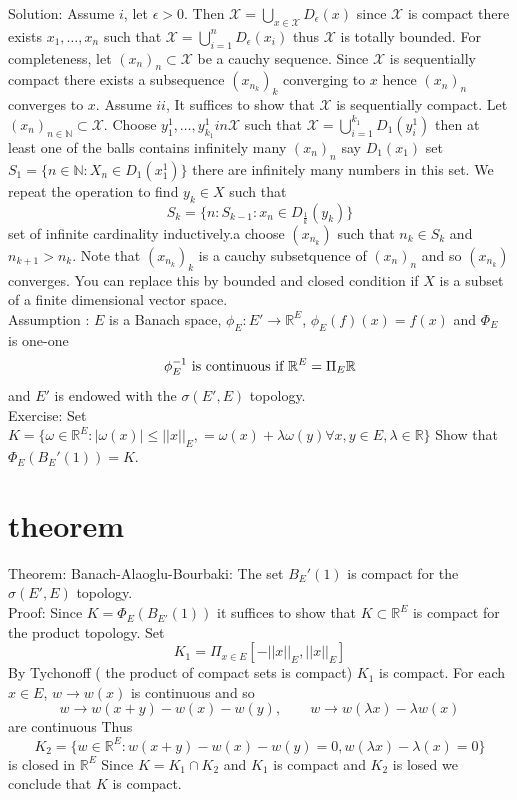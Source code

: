 \documentclass[11pt]{article}
\begin{document}
Solution: Assume $i$, let  $\epsilon > 0$. Then $ \mathcal{X} = \bigcup_{x \in \mathcal{X}} D_\epsilon(x)$ 
since $ \mathcal{X}$ is compact there exists $x_1,\dots,x_n$ such that $ \mathcal{X} = \bigcup_{i=1}^{n}D_\epsilon(x_i)$ thus $ \mathcal{X}$ is totally bounded.
For completeness, let $ (x_n)_n \subset \mathcal{X}$ be a cauchy sequence. Since $ \mathcal{X}$ is sequentially compact
there exists a subsequence $(x_{n_k})_k$ converging to  $x$ hence $(x_n)_n$ converges to  $ x$.
Assume $ii$, It suffices to show that $ \mathcal{X}$ is sequentially compact. Let $(x_n)_{n \in \mathbb{N}} \subset \mathcal{X}$.
Choose $y_1^{1},\dots,y_{k_1}^{1} in \mathcal{X}$  such that $ \mathcal{X} = \bigcup_{i=1}^{k_1}D_1(y_i^{1})$ then at least one of the balls contains infinitely many $(x_n)_n$ say  $D_1(x_1)$ set $S_1 = \{n \in \mathbb{N}: X_n \in D_1(x_1^{1})\}$ there are infinitely many numbers in this set.
We repeat the operation to find $y_k \in X$ such that
\[
    S_k = \{n : S_{k-1} : x_n \in D_{\frac{1}{k}}(y_k)\}
\] 
set of infinite cardinality inductively.a choose $(x_{n_k})$ such that $n_k \in S_k$ and  $n_{k+1} > n_k$. Note that  $(x_{n_k})_k$ is a cauchy
subsetquence of  $(x_n)_n$ and so  $(x_{n_k})$ converges. You can replace this by bounded and closed condition if $X$ is a subset of a finite dimensional vector space.\\
Assumption : $ E$ is a Banach space,  $\phi_E : E' \rightarrow \mathbb{R}^{E}$, $\phi_E(f)(x) = f(x)$ and $\Phi_E$ is one-one
 \[
     \phi_E^{-1} \text{ is continuous if $ \mathbb{R}^{E} = \Pi_E \mathbb{R}$}
\] 
and $E'$ is endowed with the  $\sigma(E', E)$ topology.\\
Exercise: Set $K = \{\omega \in \mathbb{R}^{E}: |\omega(x)| \le ||x||_E,  = \omega(x) + \lambda\omega(y) \forall x,y \in E, \lambda \in \mathbb{R}\}$
Show that $\Phi_E(B_E'(1)) = K$.
\section{theorem}
Theorem: Banach-Alaoglu-Bourbaki:
The set  $B_E'(1)$ is compact for the  $\sigma(E', E)$ topology.\\
Proof: Since $K = \Phi_E(B_{E'}(1))$ it suffices to show that  $K \subset \mathbb{R}^{E}$ is compact 
for the product topology. Set
\[
    K_1 = \Pi_{x \in E}[-||x||_E, ||x||_E]
\] 
By Tychonoff ( the product of compact sets is compact) $K_1$ is compact. For each $x \in E$,  $w \rightarrow w(x)$ is continuous and so 
\[
w \rightarrow w(x+y) - w(x) - w(y), \qquad w \to w(\lambda x) - \lambda w(x)
\] 
are continuous Thus
\[
    K_2 = \{w \in \mathbb{R}^{E}: w(x+y) - w(x) - w(y) = 0, w(\lambda x) - \lambda(x) = 0\}
\] 
is closed in $ \mathbb{R}^{E}$ Since $K = K_1 \cap K_2$ and $K_1$ is compact and $K_2$ is losed we conclude that $K$ is compact.
\end{document}
